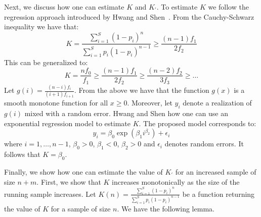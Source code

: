 \documentclass{vldb}
\begin{document}
Next, we discuss how one can estimate $K$ and $K_{\prime}$. To estimate $K$ we follow the regression approach introduced by Hwang and Shen~\cite{hwang:2010}. From the Cauchy-Schwarz inequality we have that:
\begin{equation}
K = \frac{\sum_{i=1}^S (1-p_i)^n}{\sum_{i=1}^S p_i(1-p_i)^{n-1}} \geq \frac{(n-1)f_1}{2f_2}
\end{equation}
This can be generalized to:
\begin{equation}
K=\frac{nf_0}{f_1} \geq \frac{(n-1)f_1}{2f_2} \geq \frac{(n-2)f_2}{3f_3} \geq \dots
\end{equation}
Let $g(i) = \frac{(n-i)f_i}{(i+1)f_{i+1}}$. From the above we have that the function $g(x)$ is a smooth monotone function for all $x \geq 0$. Moreover, let $y_i$ denote a realization of $g(i)$ mixed with a random error. Hwang and Shen how one can use an exponential regression model to estimate $K$. The proposed model corresponds to:
\begin{equation}
y_i = \beta_0\exp(\beta_1i^{\beta_2}) + \epsilon_i
\end{equation}
where $i = 1, \dots, n-1$, $\beta_0 > 0$, $\beta_1 < 0$, $\beta_2 >0$ and $\epsilon_i$ denotes random errors. It follows that $K = \beta_0$. 

Finally, we show how one can estimate the value of $K_\prime$ for an increased sample of size $n+m$. First, we show that $K$ increases monotonically as the size of the running sample increases. Let $K(n) = \frac{\sum_{i=1}^S (1-p_i)^n}{\sum_{i=1}^S p_i(1-p_i)^{n-1}}$ be a function returning the value of $K$ for a sample of size $n$. We have the following lemma. 
\end{document}
